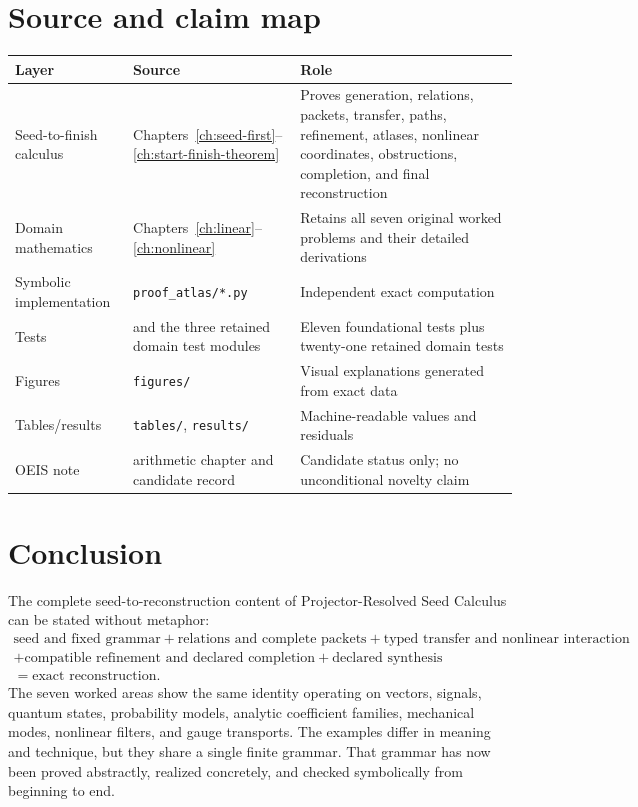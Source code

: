 \documentclass[11pt,oneside]{book}
\theoremstyle{definition}
\theoremstyle{remark}
\begin{document}
\chapter{Source and claim map}
\begin{tabularx}{\linewidth}{L{1.6in}Y Y}
\toprule
Layer & Source & Role \\
\midrule
Seed-to-finish calculus & Chapters~\ref{ch:seed-first}--\ref{ch:start-finish-theorem} & Proves generation, relations, packets, transfer, paths, refinement, atlases, nonlinear coordinates, obstructions, completion, and final reconstruction \\
Domain mathematics & Chapters~\ref{ch:linear}--\ref{ch:nonlinear} & Retains all seven original worked problems and their detailed derivations \\
Symbolic implementation & \texttt{proof\_atlas/*.py} & Independent exact computation \\
Tests &  and the three retained domain test modules & Eleven foundational tests plus twenty-one retained domain tests \\
Figures & \texttt{figures/} & Visual explanations generated from exact data \\
Tables/results & \texttt{tables/}, \texttt{results/} & Machine-readable values and residuals \\
OEIS note & arithmetic chapter and candidate record & Candidate status only; no unconditional novelty claim \\
\bottomrule
\end{tabularx}

\chapter{Conclusion}
The complete seed-to-reconstruction content of Projector-Resolved Seed Calculus can be stated without metaphor:
\[
\boxed{
\begin{gathered}
\text{seed and fixed grammar}
+\text{relations and complete packets}
+\text{typed transfer and nonlinear interaction}\\[2pt]
+\text{compatible refinement and declared completion}
+\text{declared synthesis}\\[2pt]
=\text{exact reconstruction}.
\end{gathered}
}
\]
The seven worked areas show the same identity operating on vectors, signals, quantum states, probability models, analytic coefficient families, mechanical modes, nonlinear filters, and gauge transports. The examples differ in meaning and technique, but they share a single finite grammar. That grammar has now been proved abstractly, realized concretely, and checked symbolically from beginning to end.
\end{document}
